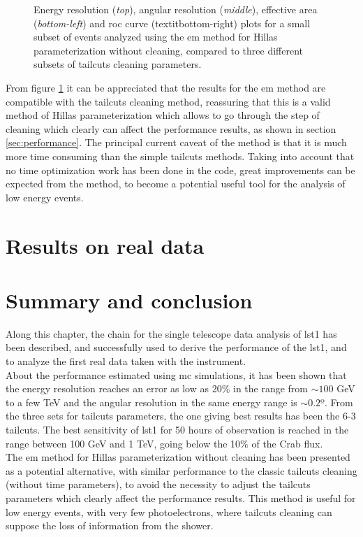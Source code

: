 \documentclass[main.tex]{subfiles}
\begin{document}
\begin{figure}
\endminipage
  \caption{Energy resolution (\textit{top}), angular resolution (\textit{middle}), effective area (\textit{bottom-left}) and \gls{roc} curve (textit{bottom-right}) plots for a small subset of events analyzed using the \gls{em} method for Hillas parameterization without cleaning, compared to three different subsets of tailcuts cleaning parameters. }
    \label{fig:em_res}
\end{figure}

From figure \ref{fig:em_res} it can be appreciated that the results for the \gls{em} method are compatible with the tailcuts cleaning method, reassuring that this is a valid method of Hillas parameterization which allows to go through the step of cleaning which clearly can affect the performance results, as shown in section \ref{sec:performance}. The principal current caveat of the method is that it is much more time consuming than the simple tailcuts methods. Taking into account that no time optimization work has been done in the code, great improvements can be expected from the method, to become a potential useful tool for the analysis of low energy events. 

\section{Results on real data}


\section{Summary and conclusion}

Along this chapter, the chain for the single telescope data analysis of \gls{lst}1 has been described, and successfully used to derive the performance of the \gls{lst1}, and to analyze the first real data taken with the instrument.\\
About the performance estimated using \gls{mc} simulations, it has been shown that the energy resolution reaches an error as low as 20\% in the range from $\sim 100$ GeV to a few TeV and the angular resolution in the same energy range is $\sim 0.2$º. From the three sets for tailcuts parameters, the one giving best results has been the 6-3 tailcuts. The best sensitivity of \gls{lst1} for 50 hours of observation is reached in the range between 100 GeV and 1 TeV, going below the 10\% of the Crab flux.\\
The \gls{em} method for Hillas parameterization without cleaning has been presented as a potential alternative, with similar performance to the classic tailcuts cleaning (without time parameters), to avoid the necessity to adjust the tailcuts parameters which clearly affect the performance results. This method is useful for low energy events, with very few photoelectrons, where tailcuts cleaning can suppose the loss of information from the shower.  
\end{document}
